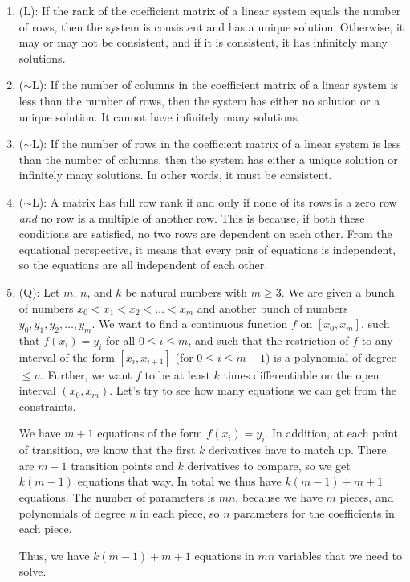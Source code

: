 \documentclass[10pt]{amsart}
\begin{document}
\begin{enumerate}
\item (L): If the rank of the coefficient matrix of a linear system
  equals the number of rows, then the system is consistent and has a
  unique solution. Otherwise, it may or may not be consistent, and if
  it is consistent, it has infinitely many solutions.
\item ($\sim$L): If the number of columns in the coefficient matrix of a linear
  system is less than the number of rows, then the system has either
  no solution or a unique solution. It cannot have infinitely many
  solutions.
\item ($\sim$L): If the number of rows in the coefficient matrix of a linear
  system is less than the number of columns, then the system has
  either a unique solution or infinitely many solutions. In other
  words, it must be consistent.
\item ($\sim$L): A matrix has full row rank if and only if none of its
  rows is a zero row {\em and} no row is a multiple of another
  row. This is because, if both these conditions are satisfied, no two
  rows are dependent on each other. From the equational perspective,
  it means that every pair of equations is independent, so the
  equations are all independent of each other.
\item (Q): Let $m$, $n$, and $k$ be natural numbers with $m \ge 3$. We are
  given a bunch of numbers $x_0 < x_1 < x_2< \dots<x_m$ and another bunch of
  numbers $y_0,y_1,y_2,\dots,y_m$. We want to find a continuous function
  $f$ on $[x_0,x_m]$, such that $f(x_i) = y_i$ for all $0 \le i \le
  m$, and such that the restriction of $f$ to any interval of the form
  $[x_i,x_{i+1}]$ (for $0 \le i \le m - 1$) is a polynomial of degree
  $\le n$. Further, we want $f$ to be at least $k$ times
  differentiable on the open interval $(x_0,x_m)$. Let's try to see
  how many equations we can get from the constraints.

  We have $m + 1$ equations of the form $f(x_i) = y_i$. In addition, at
  each point of transition, we know that the first $k$ derivatives
  have to match up. There are $m - 1$ transition points and $k$
  derivatives to compare, so we get $k(m - 1)$ equations that way. In
  total we thus have $k(m - 1) + m + 1$ equations. The number of
  parameters is $mn$, because we have $m$ pieces, and polynomials of
  degree $n$ in each piece, so $n$ parameters for the coefficients in
  each piece.

  Thus, we have $k(m - 1) + m + 1$ equations in $mn$ variables that we
  need to solve.
\end{enumerate}
\end{document}
